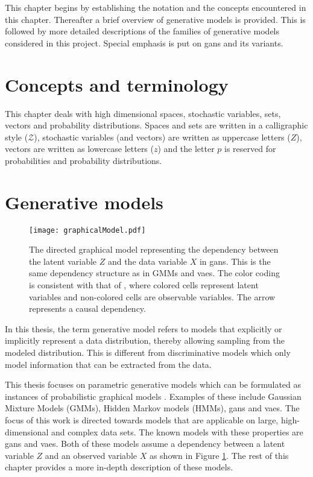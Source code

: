 This chapter begins by establishing the notation and the concepts encountered in this chapter. Thereafter a brief overview of generative models is provided. This is followed by more detailed descriptions of the families of generative models considered in this project. Special emphasis is put on \acrlong{gans} and its variants.

\section{Concepts and terminology}
This chapter deals with high dimensional spaces, stochastic variables, sets, vectors and probability distributions. Spaces and sets are written in a calligraphic style ($\mathcal{Z}$), stochastic variables (and vectors) are written as uppercase letters ($Z$), vectors are written as lowercase letters ($z$) and the letter $p$ is reserved for probabilities and probability distributions. 

\section{Generative models}
\begin{figure}[t]
    \centering
    \texttt{[image: graphicalModel.pdf]}
    \caption{The directed graphical model representing the dependency between the latent variable $Z$ and the data variable $X$ in \acrshort{gans}. This is the same dependency structure as in GMMs and \acrshort{vaes}. The color coding is consistent with that of \textcite{christopher2016pattern}, where colored cells represent latent variables and non-colored cells are observable variables. The arrow represents a causal dependency.}
    \label{fig:GANgraph}
\end{figure}
In this thesis, the term generative model refers to models that explicitly or implicitly represent a data distribution, thereby allowing sampling from the modeled distribution. This is different from discriminative models which only model information that can be extracted from the data. 

This thesis focuses on parametric generative models which can be formulated as instances of probabilistic graphical models \parencite{christopher2016pattern}. Examples of these include Gaussian Mixture Models (GMMs), Hidden Markov models (HMMs), \acrfull{gans} and \acrfull{vaes}. The focus of this work is directed towards models that are applicable on large, high-dimensional and complex data sets. The known models with these properties are  \acrshort{gans} and \acrshort{vaes}. Both of these models assume a dependency between a latent variable $Z$ and an observed variable $X$ as shown in Figure \ref{fig:GANgraph}. The rest of this chapter provides a more in-depth description of these models. 

